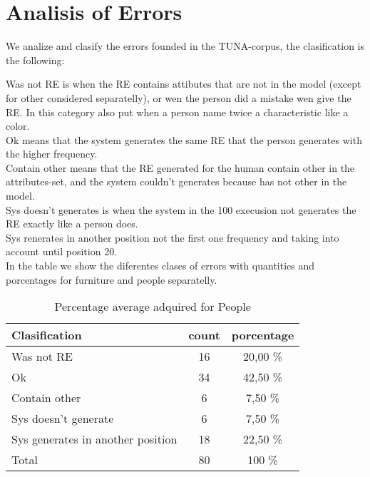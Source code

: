 \section{Analisis of Errors}
\label{sec:error}

We analize and clasify the errors founded in the TUNA-corpus, the clasification is the following:

Was not RE is when the RE contains attibutes that are not in the model (except for other considered separatelly), or wen the person did a mistake wen give the RE. In this category also put when a person name twice a characteristic like a color.\\ 
Ok means that the system generates the same RE that the person generates with the higher frequency.\\
Contain other means that the RE generated for the human contain other in the attributes-set, and the system couldn't generates because has not other in the model.\\
Sys doesn't generates is when the system in the 100 execusion not generates the RE exactly like a person does.\\
Sys renerates in another position not the first one frequency and taking into account until position 20.\\

In the table we show the diferentes clases of errors with quantities and porcentages for furniture and people separatelly.

\begin{table}[h!]
\begin{center}
\begin{tabular}{|l|c|c|}
\hline
Clasification & count & porcentage \\
\hline
Was not RE	&	16	&	20,00	\%	\\
Ok	&	34	&	42,50	\%	\\
Contain other	&	6	&	7,50	\%	\\
Sys doesn't generate	&	6	&	7,50	\%	\\
Sys generates in another position	&	18	&	22,50	\%	\\
\hline
Total	&	80	&	100	\%	\\
\hline
\end{tabular}
\caption{Percentage average adquired for People}
\end{center}
\end{table}


